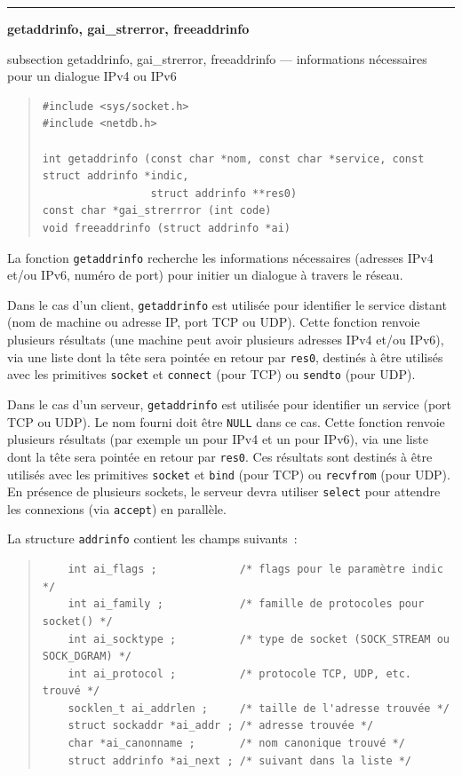 \documentclass [twoside] {report}
\newcommand {\primitive} [1]
    {
	\phantomsection
	{\large \textbf {#1}}
	\addcontentsline {toc} {subsection} {#1}
    }
\newcommand {\separation}
    {
	\vspace {5mm}
	\nopagebreak
	\hrule
    }
\begin{document}
\separation
\primitive {getaddrinfo, gai\_strerror, freeaddrinfo} --- informations
    nécessaires pour un dialogue IPv4 ou IPv6

\begin {quote}
\begin {verbatim}
#include <sys/socket.h>
#include <netdb.h>

int getaddrinfo (const char *nom, const char *service, const struct addrinfo *indic,
                 struct addrinfo **res0)
const char *gai_strerrror (int code)
void freeaddrinfo (struct addrinfo *ai)
\end{verbatim}
\end {quote}

La fonction \texttt {getaddrinfo} recherche les informations
nécessaires (adresses IPv4 et/ou IPv6, numéro de port) pour initier
un dialogue à travers le réseau.

Dans le cas d'un client, \texttt {getaddrinfo} est utilisée pour
identifier le service distant (nom de machine ou adresse IP, port
TCP ou UDP).  Cette fonction renvoie plusieurs résultats (une machine
peut avoir plusieurs adresses IPv4 et/ou IPv6), via une liste dont
la tête sera pointée en retour par \texttt {res0}, destinés à être
utilisés avec les primitives \texttt {socket} et \texttt {connect}
(pour TCP) ou \texttt {sendto} (pour UDP).

Dans le cas d'un serveur, \texttt {getaddrinfo} est utilisée pour
identifier un service (port TCP ou UDP). Le nom fourni doit être
\texttt {NULL} dans ce cas. Cette fonction renvoie plusieurs résultats
(par exemple un pour IPv4 et un pour IPv6), via une liste dont la
tête sera pointée en retour par \texttt {res0}. Ces résultats sont
destinés à être utilisés avec les primitives \texttt {socket} et
\texttt {bind} (pour TCP) ou \texttt {recvfrom} (pour UDP). En
présence de plusieurs sockets, le serveur devra utiliser \texttt
{select} pour attendre les connexions (via \texttt {accept}) en
parallèle.

La structure \texttt {addrinfo} contient les champs suivants~:

\begin {quote}
    \small
\begin {verbatim}
    int ai_flags ;             /* flags pour le paramètre indic */
    int ai_family ;            /* famille de protocoles pour socket() */
    int ai_socktype ;          /* type de socket (SOCK_STREAM ou SOCK_DGRAM) */
    int ai_protocol ;          /* protocole TCP, UDP, etc. trouvé */
    socklen_t ai_addrlen ;     /* taille de l'adresse trouvée */
    struct sockaddr *ai_addr ; /* adresse trouvée */
    char *ai_canonname ;       /* nom canonique trouvé */
    struct addrinfo *ai_next ; /* suivant dans la liste */
\end{verbatim}
\end {quote}
\end{document}
